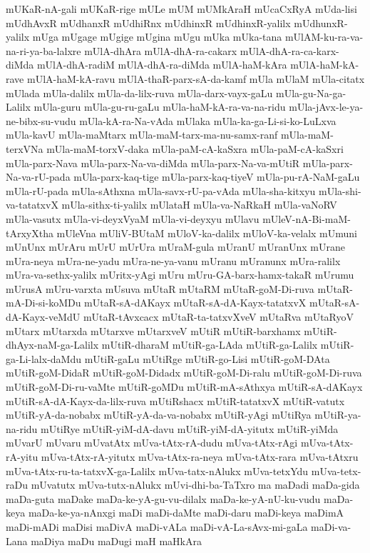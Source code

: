 {mUKaR-nA-gali
mUKaR-rige
mULe
mUM
mUMkAraH
mUcaCxRyA
mUda-lisi
mUdhAvxR
mUdhanxR
mUdhiRnx
mUdhinxR
mUdhinxR-yalilx
mUdhunxR-yalilx
mUga
mUgage
mUgige
mUgina
mUgu
mUka
mUka-tana
mUlAM-ku-ra-va-na-ri-ya-ba-lalxre
mUlA-dhAra
mUlA-dhA-ra-cakarx
mUlA-dhA-ra-ca-karx-diMda
mUlA-dhA-radiM
mUlA-dhA-ra-diMda
mUlA-haM-kAra
mUlA-haM-kA-rave
mUlA-haM-kA-ravu
mUlA-thaR-parx-sA-da-kamf
mUla
mUlaM
mUla-citatx
mUlada
mUla-dalilx
mUla-da-lilx-ruva
mUla-darx-vayx-gaLu
mUla-gu-Na-ga-Lalilx
mUla-guru
mUla-gu-ru-gaLu
mUla-haM-kA-ra-va-na-ridu
mUla-jAvx-le-ya-ne-bibx-su-vudu
mUla-kA-ra-Na-vAda
mUlaka
mUla-ka-ga-Li-si-ko-LuLxva
mUla-kavU
mUla-maMtarx
mUla-maM-tarx-ma-nu-samx-ranf
mUla-maM-terxVNa
mUla-maM-torxV-daka
mUla-paM-cA-kaSxra
mUla-paM-cA-kaSxri
mUla-parx-Nava
mUla-parx-Na-va-diMda
mUla-parx-Na-va-mUtiR
mUla-parx-Na-va-rU-pada
mUla-parx-kaq-tige
mUla-parx-kaq-tiyeV
mUla-pu-rA-NaM-gaLu
mUla-rU-pada
mUla-sAthxna
mUla-savx-rU-pa-vAda
mUla-sha-kitxyu
mUla-shi-va-tatatxvX
mUla-sithx-ti-yalilx
mUlataH
mUla-va-NaRkaH
mUla-vaNoRV
mUla-vasutx
mUla-vi-deyxVyaM
mUla-vi-deyxyu
mUlavu
mUleV-nA-Bi-maM-tArxyXtha
mUleVna
mUliV-BUtaM
mUloV-ka-dalilx
mUloV-ka-velalx
mUmuni
mUnUnx
mUrAru
mUrU
mUrUra
mUraM-gula
mUranU
mUranUnx
mUrane
mUra-neya
mUra-ne-yadu
mUra-ne-ya-vanu
mUranu
mUranunx
mUra-ralilx
mUra-va-sethx-yalilx
mUritx-yAgi
mUru
mUru-GA-barx-hamx-takaR
mUrumu
mUrusA
mUru-varxta
mUsuva
mUtaR
mUtaRM
mUtaR-goM-Di-ruva
mUtaR-mA-Di-si-koMDu
mUtaR-sA-dAKayx
mUtaR-sA-dA-Kayx-tatatxvX
mUtaR-sA-dA-Kayx-veMdU
mUtaR-tAvxcacx
mUtaR-ta-tatxvXveV
mUtaRva
mUtaRyoV
mUtarx
mUtarxda
mUtarxve
mUtarxveV
mUtiR
mUtiR-barxhamx
mUtiR-dhAyx-naM-ga-Lalilx
mUtiR-dharaM
mUtiR-ga-LAda
mUtiR-ga-Lalilx
mUtiR-ga-Li-lalx-daMdu
mUtiR-gaLu
mUtiRge
mUtiR-go-Lisi
mUtiR-goM-DAta
mUtiR-goM-DidaR
mUtiR-goM-Didadx
mUtiR-goM-Di-ralu
mUtiR-goM-Di-ruva
mUtiR-goM-Di-ru-vaMte
mUtiR-goMDu
mUtiR-mA-sAthxya
mUtiR-sA-dAKayx
mUtiR-sA-dA-Kayx-da-lilx-ruva
mUtiRshacx
mUtiR-tatatxvX
mUtiR-vatutx
mUtiR-yA-da-nobabx
mUtiR-yA-da-va-nobabx
mUtiR-yAgi
mUtiRya
mUtiR-ya-na-ridu
mUtiRye
mUtiR-yiM-dA-davu
mUtiR-yiM-dA-yitutx
mUtiR-yiMda
mUvarU
mUvaru
mUvatAtx
mUva-tAtx-rA-dudu
mUva-tAtx-rAgi
mUva-tAtx-rA-yitu
mUva-tAtx-rA-yitutx
mUva-tAtx-ra-neya
mUva-tAtx-rara
mUva-tAtxru
mUva-tAtx-ru-ta-tatxvX-ga-Lalilx
mUva-tatx-nAlukx
mUva-tetxYdu
mUva-tetx-raDu
mUvatutx
mUva-tutx-nAlukx
mUvi-dhi-ba-TaTxro
ma
maDadi
maDa-gida
maDa-guta
maDake
maDa-ke-yA-gu-vu-dilalx
maDa-ke-yA-nU-ku-vudu
maDa-keya
maDa-ke-ya-nAnxgi
maDi
maDi-daMte
maDi-daru
maDi-keya
maDimA
maDi-mADi
maDisi
maDivA
maDi-vALa
maDi-vA-La-sAvx-mi-gaLa
maDi-va-Lana
maDiya
maDu
maDugi
maH
maHkAra
}
